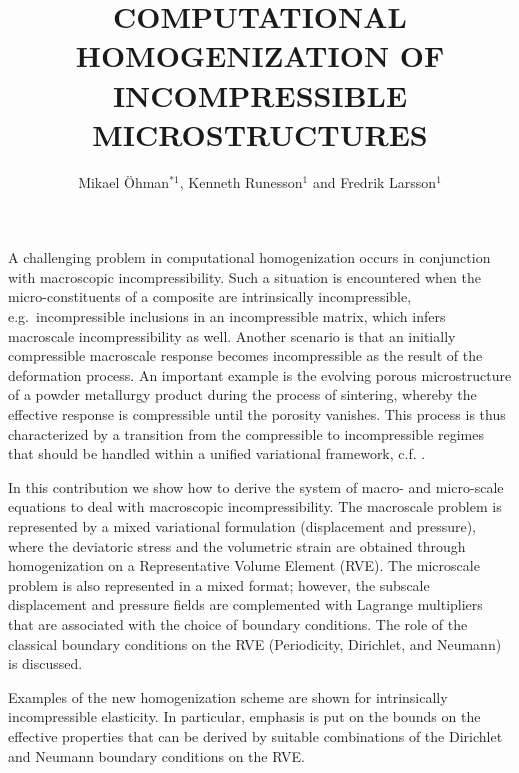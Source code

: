 \documentclass{Eccomas}
\title{COMPUTATIONAL HOMOGENIZATION OF INCOMPRESSIBLE MICROSTRUCTURES}
\author{Mikael \"Ohman$^{*1}$, Kenneth Runesson$^{1}$ and Fredrik Larsson$^{1}$}
\begin{document}
A challenging problem in computational homogenization occurs in conjunction with macroscopic incompressibility. 
Such a situation is encountered when the micro-constituents of a composite are intrinsically incompressible, e.g.\ incompressible inclusions in an incompressible matrix, which infers macroscale incompressibility as well. Another scenario is that an initially compressible macroscale response becomes incompressible as the result of the deformation process. An important example is the evolving porous microstructure of a powder metallurgy product during the process of sintering, whereby the effective response is compressible until the porosity vanishes. This process is thus characterized by a transition from the compressible to incompressible regimes that should be handled within a unified variational framework, c.f. \cite{Ohman2013}.

In this contribution we show how to derive the system of macro- and micro-scale equations to deal with macroscopic incompressibility.
The macroscale problem is represented by a mixed variational formulation (displacement and pressure), where the deviatoric stress and the volumetric strain are obtained through homogenization on a Representative Volume Element (RVE). The microscale problem is also represented in a mixed format; however, the subscale displacement and pressure fields are complemented with Lagrange multipliers that are associated with the choice of boundary conditions. The role of the classical boundary conditions on the RVE (Periodicity, Dirichlet, and Neumann) is discussed.

Examples of the new homogenization scheme are shown for intrinsically incompressible elasticity. In particular, emphasis is put on the bounds on the effective properties that can be derived by suitable combinations of the Dirichlet and Neumann boundary conditions on the RVE.
\end{document}
